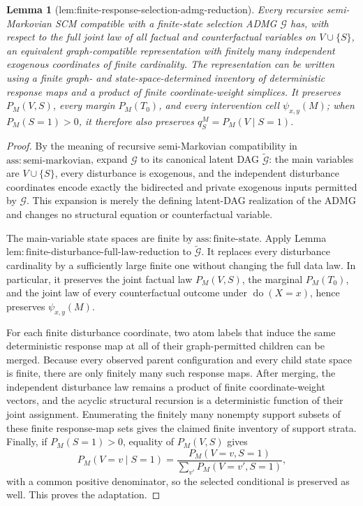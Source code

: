 \documentclass{article}
\newtheorem{lemma}{Lemma}
\begin{document}
\begin{lemma}[lem:finite-response-selection-admg-reduction]\label{lem:finite-response-selection-admg-reduction}
Every recursive semi-Markovian SCM compatible with a finite-state selection ADMG \(\mathcal G\) has, with respect to the full joint law of all factual and counterfactual variables on \(V\cup\{S\}\), an equivalent graph-compatible representation with finitely many independent exogenous coordinates of finite cardinality.  The representation can be written using a finite graph- and state-space-determined inventory of deterministic response maps and a product of finite coordinate-weight simplices.  It preserves \(P_M(V,S)\), every margin \(P_M(T_0)\), and every intervention cell \(\psi_{x,y}(M)\); when \(P_M(S=1)>0\), it therefore also preserves \(q_S^M=P_M(V\mid S=1)\).
\end{lemma}
\begin{proof}
By the meaning of recursive semi-Markovian compatibility in \(\mathrm{ass{:}semi\text{-}markovian}\), expand \(\mathcal G\) to its canonical latent DAG \(\widetilde{\mathcal G}\): the main variables are \(V\cup\{S\}\), every disturbance is exogenous, and the independent disturbance coordinates encode exactly the bidirected and private exogenous inputs permitted by \(\mathcal G\).  This expansion is merely the defining latent-DAG realization of the ADMG and changes no structural equation or counterfactual variable.

The main-variable state spaces are finite by \(\mathrm{ass{:}finite\text{-}state}\).  Apply Lemma \(\mathrm{lem{:}finite\text{-}disturbance\text{-}full\text{-}law\text{-}reduction}\) to \(\widetilde{\mathcal G}\).  It replaces every disturbance cardinality by a sufficiently large finite one without changing the full data law.  In particular, it preserves the joint factual law \(P_M(V,S)\), the marginal \(P_M(T_0)\), and the joint law of every counterfactual outcome under \(\operatorname{do}(X=x)\), hence preserves \(\psi_{x,y}(M)\).

For each finite disturbance coordinate, two atom labels that induce the same deterministic response map at all of their graph-permitted children can be merged.  Because every observed parent configuration and every child state space is finite, there are only finitely many such response maps.  After merging, the independent disturbance law remains a product of finite coordinate-weight vectors, and the acyclic structural recursion is a deterministic function of their joint assignment.  Enumerating the finitely many nonempty support subsets of these finite response-map sets gives the claimed finite inventory of support strata.  Finally, if \(P_M(S=1)>0\), equality of \(P_M(V,S)\) gives
\[
 P_M(V=v\mid S=1)=\frac{P_M(V=v,S=1)}{\sum_{v'}P_M(V=v',S=1)},
\]
with a common positive denominator, so the selected conditional is preserved as well.  This proves the adaptation.
\end{proof}
\end{document}

